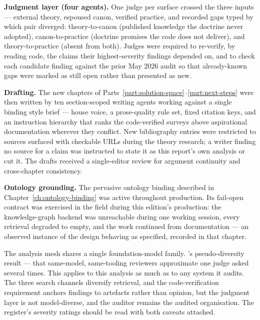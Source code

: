 \textbf{Judgment layer (four agents).} One judge per surface crossed the three inputs --- external theory, espoused canon, verified practice, and recorded gaps typed by which pair diverged: theory-to-canon (published knowledge the doctrine never adopted), canon-to-practice (doctrine promises the code does not deliver), and theory-to-practice (absent from both). Judges were required to re-verify, by reading code, the claims their highest-severity findings depended on, and to check each candidate finding against the prior May 2026 audit so that already-known gaps were marked as still open rather than presented as new.

\textbf{Drafting.} The new chapters of Parts~\ref{part:solution-space}--\ref{part:next-steps} were then written by ten section-scoped writing agents working against a single binding style brief --- house voice, a prose-quality rule set, fixed citation keys, and an instruction hierarchy that ranks the code-verified surveys above aspirational documentation wherever they conflict. New bibliography entries were restricted to sources surfaced with checkable URLs during the theory research; a writer finding no source for a claim was instructed to state it as this report's own analysis or cut it. The drafts received a single-editor review for argument continuity and cross-chapter consistency.

\textbf{Ontology grounding.} The pervasive ontology binding described in Chapter~\ref{ch:ontology-binding} was active throughout production. Its fail-open contract was exercised in the field during this edition's production: the knowledge-graph backend was unreachable during one working session, every retrieval degraded to empty, and the work continued from documentation --- an observed instance of the design behaving as specified, recorded in that chapter.

\begin{cautionbox}[title={Limits of the Mesh Method}]
The analysis mesh shares a single foundation-model family. \textcite{Liu2026}'s pseudo-diversity result --- that same-model, same-tooling reviewers approximate one judge asked several times. This applies to this analysis as much as to any system it audits. The three search channels diversify retrieval, and the code-verification requirement anchors findings to artefacts rather than opinion, but the judgment layer is not model-diverse, and the auditor remains the audited organisation. The register's severity ratings should be read with both caveats attached.
\end{cautionbox}

